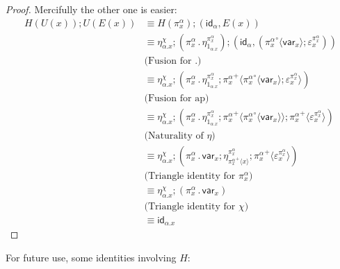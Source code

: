 \documentclass[10pt]{article}
\theoremstyle{definition}
\newcommand\var[1]{\ensuremath{\mathsf{var}_{#1}}}
\newcommand{\id}{\mathsf{id}}
\newcommand\ap[2]{\ensuremath{#1 \langle #2 \rangle }}
\newcommand\ApPlus[2]{\ensuremath{{#1}^+ \langle #2 \rangle }}
\newcommand\bdot[0]{\mathbin{.}}
\begin{document}
\begin{proof}
Mercifully the other one is easier:
\begin{align*}
H(U(x)); U(E(x))
&\equiv H(\pi^\alpha_x) ; (\id_\alpha, E(x)) \\
&\equiv \eta^\chi_{\alpha.x} ; (\pi^\alpha_x \bdot \eta^{{\pi^\alpha_x}}_{1_{\alpha.x}}) ; (\id_\alpha, (\ap{{\pi^\alpha_x}^\circ}{\var{x}} ; \varepsilon^{{\pi^\alpha_x}}_x)) \\
& \text{(Fusion for $\bdot$)} \\
&\equiv \eta^\chi_{\alpha.x} ; (\pi^\alpha_x \bdot \eta^{{\pi^\alpha_x}}_{1_{\alpha.x}} ; \ApPlus{{\pi^\alpha_x}}{\ap{{\pi^\alpha_x}^\circ}{\var{x}} ; \varepsilon^{{\pi^\alpha_x}}_x}) \\
& \text{(Fusion for ap)} \\
&\equiv \eta^\chi_{\alpha.x} ; (\pi^\alpha_x \bdot \eta^{{\pi^\alpha_x}}_{1_{\alpha.x}} ; \ApPlus{{\pi^\alpha_x}}{\ap{{\pi^\alpha_x}^\circ}{\var{x}}} ; \ApPlus{{\pi^\alpha_x}}{\varepsilon^{{\pi^\alpha_x}}_x}) \\
& \text{(Naturality of $\eta$)} \\
&\equiv \eta^\chi_{\alpha.x} ; (\pi^\alpha_x \bdot \var{x} ; \eta^{{\pi^\alpha_x}}_{\ApPlus{{\pi^\alpha_x}}{x}} ; \ApPlus{{\pi^\alpha_x}}{\varepsilon^{{\pi^\alpha_x}}_x}) \\
&\text{(Triangle identity for ${\pi^\alpha_x}$)} \\
&\equiv \eta^\chi_{\alpha.x} ; (\pi^\alpha_x \bdot \var{x}) \\
&\text{(Triangle identity for $\chi$)} \\
&\equiv \id_{\alpha.x}
\end{align*}
\end{proof}

For future use, some identities involving $H$: 
\end{document}

